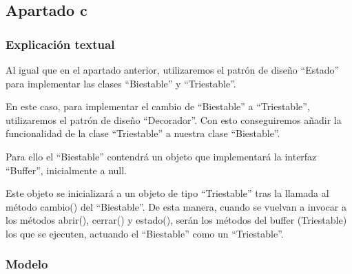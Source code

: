 \documentclass[11pt,a4paper]{article}
\begin{document}
\subsection{Apartado c}

\subsubsection{Explicación textual}
Al igual que en el apartado anterior, utilizaremos el patrón de diseño ``Estado'' para implementar las clases ``Biestable'' y ``Triestable''.

En este caso, para implementar el cambio de ``Biestable'' a ``Triestable'', utilizaremos el patrón de diseño ``Decorador''. Con esto conseguiremos añadir la funcionalidad de la clase ``Triestable'' a nuestra clase ``Biestable''.

Para ello el ``Biestable'' contendrá un objeto que implementará la interfaz ``Buffer'', inicialmente a null. 

Este objeto se inicializará a un objeto de tipo ``Triestable'' tras la llamada al método cambio() del ``Biestable''. De esta manera, cuando se vuelvan a invocar a los métodos abrir(), cerrar() y estado(), serán los métodos del buffer (Triestable) los que se ejecuten, actuando el ``Biestable'' como un ``Triestable''.

\subsubsection{Modelo}


\begin{figure}[H]
\end{figure}
\end{document}
